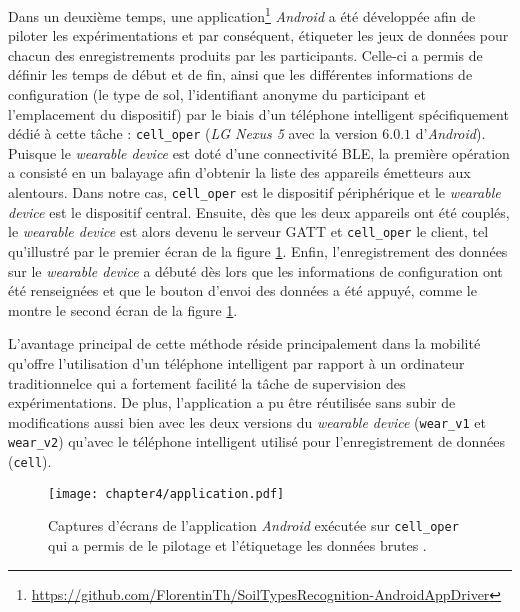 Dans un deuxième temps, une application\footnote{\url{https://github.com/FlorentinTh/SoilTypesRecognition-AndroidAppDriver}} \textit{Android} a été développée afin de piloter les expérimentations et par conséquent, étiqueter les jeux de données pour chacun des enregistrements produits par les participants. Celle-ci a permis de définir les temps de début et de fin, ainsi que les différentes informations de configuration (le type de sol, l'identifiant anonyme du participant et l'emplacement du dispositif) par le biais d'un téléphone intelligent spécifiquement dédié à cette tâche : \texttt{cell\_oper} (\textit{LG Nexus 5} avec la version $6.0.1$ d'\textit{Android}). Puisque le \textit{wearable device} est doté d'une connectivité \acs{BLE}, la première opération a consisté en un balayage afin d'obtenir la liste des appareils émetteurs aux alentours. Dans notre cas, \texttt{cell\_oper} est le dispositif périphérique et le \textit{wearable device} est le dispositif central. Ensuite, dès que les deux appareils ont été couplés, le \textit{wearable device} est alors devenu le serveur \acs{GATT} et \texttt{cell\_oper} le client, tel qu'illustré par le premier écran de la figure \ref{fig:application}. Enfin, l'enregistrement des données sur le \textit{wearable device} a débuté dès lors que les informations de configuration ont été renseignées et que le bouton d'envoi des données a été appuyé, comme le montre le second écran de la figure \ref{fig:application}.

L'avantage principal de cette méthode réside principalement dans la mobilité qu'offre l'utilisation d'un téléphone intelligent par rapport à un ordinateur traditionnel\textemdash ce qui a fortement facilité la tâche de supervision des expérimentations. De plus, l'application a pu être réutilisée sans subir de modifications aussi bien avec les deux versions du \textit{wearable device} (\texttt{wear\_v1} et \texttt{wear\_v2}) qu'avec le téléphone intelligent utilisé pour l'enregistrement de données (\texttt{cell}).

\begin{figure}[H]
	\centering
	\texttt{[image: chapter4/application.pdf]}
        \caption[Captures d'écrans de l'application \textit{Android} exécutée sur \texttt{cell\_oper} qui a permis de le pilotage et l'étiquetage les données brutes.]{Captures d'écrans de l'application \textit{Android} exécutée sur \texttt{cell\_oper} qui a permis de le pilotage et l'étiquetage les données brutes \citep{Thullier2017}.}
	\label{fig:application}
\end{figure}

